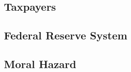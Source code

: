 
\subsection{Taxpayers \label{sec:taxpayers}}

\subsection{Federal Reserve System \label{sec:federalReserve}}

\subsection{Moral Hazard \label{sec:moralHazard}}
